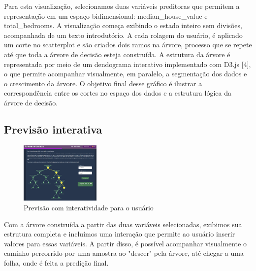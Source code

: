\documentclass[conference]{IEEEtran}
\begin{document}
Para esta visualização, selecionamos duas variáveis preditoras que permitem a representação em um espaço bidimensional: median\_house\_value e total\_bedrooms. A visualização começa exibindo o estado inteiro sem divisões, acompanhada de um texto introdutório. A cada rolagem do usuário, é aplicado um corte no scatterplot e são criados dois ramos na árvore, processo que se repete até que toda a árvore de decisão esteja construída. A estrutura da árvore é representada por meio de um dendograma interativo implementado com D3.js [4], o que permite acompanhar visualmente, em paralelo, a segmentação dos dados e o crescimento da árvore. O objetivo final desse gráfico é ilustrar a correspondência entre os cortes no espaço dos dados e a estrutura lógica da árvore de decisão.


\subsection{Previsão interativa}

\begin{figure}[h]
    \centering
    \includegraphics[width=0.35\textwidth]{prev.png}
    \caption{Previsão com interatividade para o usuário}
    \label{fig:minha_imagem}
\end{figure}

    Com a árvore construída a partir das duas variáveis selecionadas, exibimos sua estrutura completa e incluímos uma interação que permite ao usuário inserir valores para essas variáveis. A partir disso, é possível acompanhar visualmente o caminho percorrido por uma amostra ao "descer" pela árvore, até chegar a uma folha, onde é feita a predição final.
\end{document}
